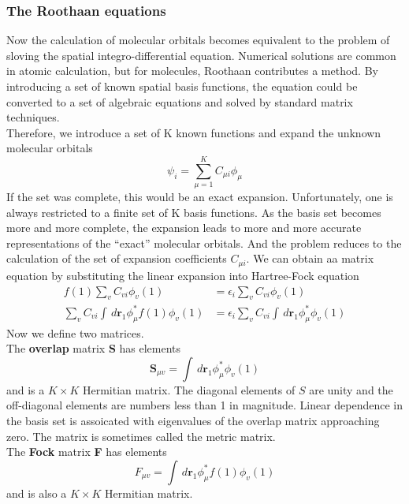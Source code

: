 \documentclass[11pt]{article}
\begin{document}
\subsubsection{The Roothaan equations}
Now the calculation of molecular orbitals becomes equivalent to the problem of sloving the spatial integro-differential
equation. Numerical solutions are common in atomic calculation, but for molecules, Roothaan contributes a method. By introducing
a set of known spatial basis functions, the equation could be converted to a set of algebraic equations and solved by standard
matrix techniques.\\
Therefore, we introduce a set of K known functions and expand the unknown molecular orbitals
\begin{equation}
    \psi_i=\sum_{\mu=1}^{K}C_{\mu i}\phi_{\mu}
\end{equation}
If the set was complete, this would be an exact expansion. Unfortunately, one is always restricted to a finite set of K basis functions.
As the basis set becomes more and more complete, the expansion leads to more and more accurate representations of the ``exact'' molecular
orbitals. And the problem reduces to the calculation of the set of expansion coefficients $C_{\mu i}$. We can obtain aa matrix equation by
substituting the linear expansion into Hartree-Fock equation
\begin{align}
    f(1)\sum_{v}C_{vi}\phi_v(1)&=\epsilon_i\sum_{v}C_{vi}\phi_v(1)\\
    \sum_{v}C_{vi}\int\,d\mathbf{r}_1\phi_\mu^*f(1)\phi_v(1)&=\epsilon_i\sum_{v}C_{vi}\int\,d\mathbf{r}_1\phi_\mu^*\phi_v(1)
\end{align}
Now we define two matrices.\\
The \textbf{overlap} matrix \textbf{S} has elements
\begin{equation}
    \mathbf{S}_{\mu v}=\int\,d\mathbf{r}_1\phi_\mu^*\phi_v(1)
\end{equation}
and is a $K \times K$ Hermitian matrix. The diagonal elements of $S$ are unity and the off-diagonal elements are numbers less than 1 in magnitude.
Linear dependence in the basis set is assoicated with eigenvalues of the overlap matrix approaching zero. The matrix is sometimes called the metric matrix.\\
The \textbf{Fock} matrix \textbf{F} has elements
\begin{equation}
    F_{\mu v}=\int\,d\mathbf{r}_1\phi_\mu^*f(1)\phi_v(1)
\end{equation}
and is also a $K \times K$ Hermitian matrix.\\
\end{document}
